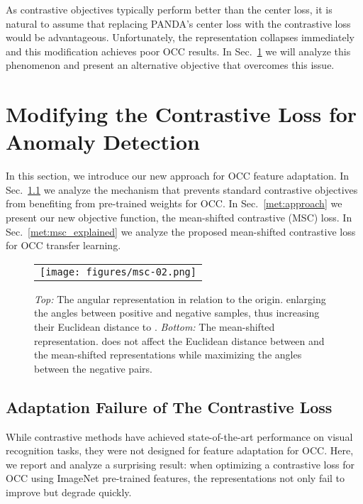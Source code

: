 \documentclass[letterpaper]{article} \usepackage{aaai23}  \usepackage{times}  \usepackage{helvet}  \usepackage{courier}  \usepackage[hyphens]{url}  \usepackage{graphicx} \usepackage{amsmath, amssymb}
\begin{document}
As contrastive objectives typically perform better than the center loss, it is natural to assume that replacing PANDA's center loss with the contrastive loss would be advantageous. Unfortunately, the representation collapses immediately and this modification achieves poor OCC results. In Sec.~\ref{sec:method} we will analyze this phenomenon and present an alternative objective that overcomes this issue.

\section{Modifying the Contrastive Loss for Anomaly Detection}
\label{sec:method}
In this section, we introduce our new approach for OCC feature adaptation. In Sec.~\ref{met:contrastive} we analyze the mechanism that prevents standard contrastive objectives from benefiting from pre-trained weights for OCC. In Sec.~\ref{met:approach} we present our new objective function, the mean-shifted contrastive (MSC) loss. In Sec.~\ref{met:msc_explained} we analyze the proposed mean-shifted contrastive loss for OCC transfer learning.

\begin{figure*}[t]
  \centering
    \begin{tabular}{c}
    \texttt{[image: figures/msc-02.png]} 
    \end{tabular}
    \caption{\textit{Top:} The angular representation in relation to the origin.  enlarging the angles between positive and negative samples, thus increasing their Euclidean distance to . \textit{Bottom:} The mean-shifted representation.  does not affect the Euclidean distance between  and the mean-shifted representations while maximizing the angles between the negative pairs.}
    \label{fig:angular_rep}
\end{figure*}

\subsection{Adaptation Failure of The Contrastive Loss}
\label{met:contrastive}

While contrastive methods have achieved state-of-the-art performance on visual recognition tasks, they were not designed for feature adaptation for OCC. Here, we report and analyze a surprising result: when optimizing a contrastive loss for OCC using ImageNet pre-trained features, the representations not only fail to improve but degrade quickly.
\end{document}
